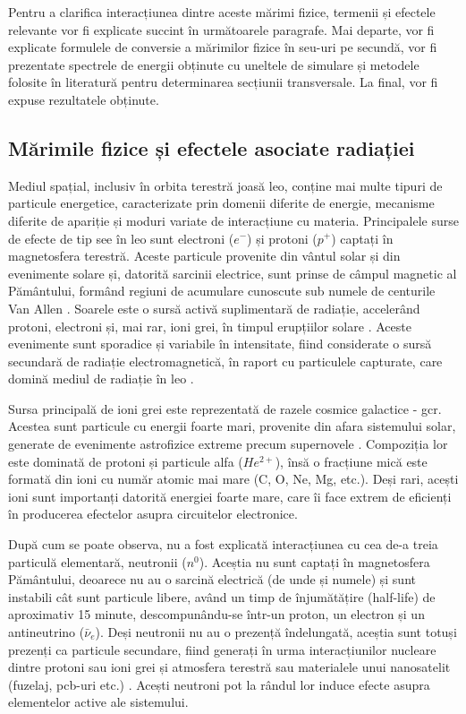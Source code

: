 \documentclass[12pt,a4paper]{report}
\begin{document}
Pentru a clarifica interacțiunea dintre aceste mărimi fizice, termenii și efectele relevante vor fi explicate succint în următoarele paragrafe. Mai departe, vor fi explicate formulele de conversie a mărimilor fizice în \gls{seu}-uri pe secundă, vor fi prezentate spectrele de energii obținute cu uneltele de simulare și metodele folosite în literatură pentru determinarea secțiunii transversale. La final, vor fi expuse rezultatele obținute.

\subsection{Mărimile fizice și efectele asociate radiației}
Mediul spațial, inclusiv în orbita terestră joasă \gls{leo}, conține mai multe tipuri de particule energetice, caracterizate prin domenii diferite de energie, mecanisme diferite de apariție și moduri variate de interacțiune cu materia. Principalele surse de efecte de tip \gls{see} în \gls{leo} sunt electroni (\(e^-\)) și protoni (\(p^+\)) captați în magnetosfera terestră. Aceste particule provenite din vântul solar și din evenimente solare și, datorită sarcinii electrice, sunt prinse de câmpul magnetic al Pământului, formând regiuni de acumulare cunoscute sub numele de centurile Van Allen \cite{van_allen_belts}. Soarele este o sursă activă suplimentară de radiație, accelerând protoni, electroni și, mai rar, ioni grei, în timpul erupțiilor solare \cite{solar_radiation}. Aceste evenimente sunt sporadice și variabile în intensitate, fiind considerate o sursă secundară de radiație electromagnetică, în raport cu particulele capturate, care domină mediul de radiație în \gls{leo} \cite{space_radiation_enviroment}. 

Sursa principală de ioni grei este reprezentată de razele cosmice galactice - \gls{gcr}. Acestea sunt particule cu energii foarte mari, provenite din afara sistemului solar, generate de evenimente astrofizice extreme precum supernovele \cite{gcrs}. Compoziția lor este dominată de protoni și particule alfa (\(He^{2+}\)), însă o fracțiune mică este formată din ioni cu număr atomic mai mare (C, O, Ne, Mg, etc.). Deși rari, acești ioni sunt importanți datorită energiei foarte mare, care îi face extrem de eficienți în producerea efectelor asupra circuitelor electronice.

După cum se poate observa, nu a fost explicată interacțiunea cu cea de-a treia particulă elementară, neutronii (\(n^0\)). Aceștia nu sunt captați în magnetosfera Pământului, deoarece nu au o sarcină electrică (de unde și numele) și sunt instabili cât sunt particule libere, având un timp de înjumătățire (half-life) de aproximativ 15 minute, descompunându-se într-un proton, un electron și un antineutrino (\(\bar{\nu}_e\)). Deși neutronii nu au o prezență îndelungată, aceștia sunt totuși prezenți ca particule secundare, fiind generați în urma interacțiunilor nucleare dintre protoni sau ioni grei și atmosfera terestră sau materialele unui nanosatelit (fuzelaj, \gls{pcb}-uri etc.) \cite{space_radiation_enviroment}. Acești neutroni pot la rândul lor induce efecte asupra elementelor active ale sistemului. 
\end{document}
